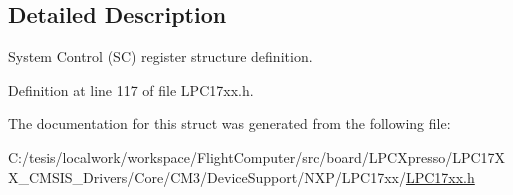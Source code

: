 \subsection{\-Detailed \-Description}
\-System \-Control (\-S\-C) register structure definition. 

\-Definition at line 117 of file \-L\-P\-C17xx.\-h.



\-The documentation for this struct was generated from the following file\-:\begin{DoxyCompactItemize}
\item 
\-C\-:/tesis/localwork/workspace/\-Flight\-Computer/src/board/\-L\-P\-C\-Xpresso/\-L\-P\-C17\-X\-X\-\_\-\-C\-M\-S\-I\-S\-\_\-\-Drivers/\-Core/\-C\-M3/\-Device\-Support/\-N\-X\-P/\-L\-P\-C17xx/\hyperlink{_l_p_c17xx_8h}{\-L\-P\-C17xx.\-h}\end{DoxyCompactItemize}
